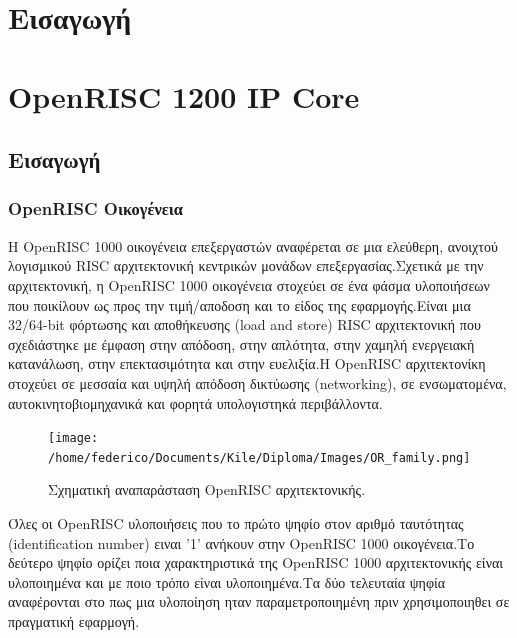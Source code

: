 \documentclass[a4paper,10pt]{article}
\numberwithin{figure}{section}
\numberwithin{table}{section}
\begin{document}

\newpage
\tableofcontents
\newpage
\listoffigures
\newpage
\listoftables
\newpage

\section{Εισαγωγή}
{


}

\section{OpenRISC 1200 IP Core}
{
\subsection{Εισαγωγή}
{
}
\subsubsection{OpenRISC Οικογένεια}
{Η OpenRISC 1000 οικογένεια επεξεργαστών αναφέρεται σε μια ελεύθερη, ανοιχτού
λογισμικού RISC αρχιτεκτονική κεντρικών μονάδων επεξεργασίας.Σχετικά με την
αρχιτεκτονική, η OpenRISC 1000 οικογένεια στοχεύει σε ένα φάσμα υλοποιήσεων που	
ποικίλουν ως προς την τιμή/αποδοση και το είδος της εφαρμογής.Είναι μια 
32/64-bit φόρτωσης και αποθήκευσης (load and store) RISC αρχιτεκτονική που σχεδιάστηκε
με έμφαση στην απόδοση, στην απλότητα, στην χαμηλή ενεργειακή κατανάλωση, στην επεκτασιμότητα
και στην ευελιξία.Η OpenRISC αρχιτεκτονίκη στοχεύει σε μεσσαία και υψηλή απόδοση
δικτύωσης (networking), σε ενσωματομένα, αυτοκινητοβιομηχανικά και φορητά υπολογιστηκά περιβάλλοντα.

\vspace{0.7cm}
\begin{figure}[h!]
 \centering
 \texttt{[image: /home/federico/Documents/Kile/Diploma/Images/OR\_family.png]}
 \caption{Σχηματική αναπαράσταση OpenRISC αρχιτεκτονικής.}
\end{figure}
\vspace{0.7cm}


Όλες οι OpenRISC υλοποιήσεις που το πρώτο ψηφίο στον αριθμό ταυτότητας
(identification number) ειναι '1' ανήκουν στην 
OpenRISC 1000 οικογένεια.Το δεύτερο ψηφίο ορίζει ποια χαρακτηριστικά της OpenRISC
1000 αρχιτεκτονικής είναι υλοποιημένα και με ποιο τρόπο είναι υλοποιημένα.Τα δύο
τελευταία ψηφία αναφέρονται στο πως μια υλοποίηση ηταν παραμετροποιημένη πριν 
χρησιμοποιηθει σε πραγματική εφαρμογή.
}
}
\end{document}
